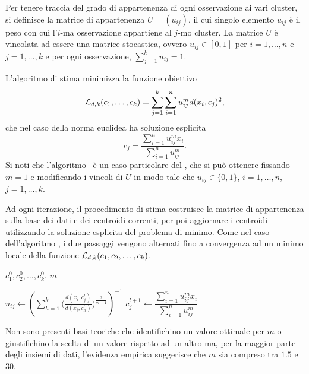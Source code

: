 \documentclass[runningheads]{llncs}
\begin{document}
Per tenere traccia del grado di appartenenza di ogni osservazione ai vari cluster, si definisce la matrice di appartenenza $U = \left( u_{ij} \right)$, il cui singolo elemento $u_{ij}$ è il peso con cui l'$i$-ma osservazione appartiene al $j$-mo cluster.
La matrice $U$ è vincolata ad essere una matrice stocastica, ovvero $u_{ij} \in [0,1]$ per $i = 1, \ldots, n$ e $j = 1, \ldots, k$ e per ogni osservazione, $\sum_{j=1}^{k} u_{ij} = 1$.

L'algoritmo di stima minimizza la funzione obiettivo
\[
     \mathcal{L}_{d,k}(c_1, \ldots, c_k) = \sum_{j=1}^{k} \sum_{i=1}^{n} u_{ij}^{m}d(x_i, c_j)^2 ,
\]
che nel caso della norma euclidea ha soluzione esplicita
\[
    c_j =\frac{ \sum_{i=1}^{n} u_{ij}^{m} x_i}{\sum_{i=1}^{n} u_{ij}^{m}}.
\]
Si noti che l'algoritmo \km\ è un caso particolare del \fcm, che si può ottenere fissando $m=1$ e modificando i vincoli di $U$ in modo tale che $u_{ij} \in \{0,1\}$, $i = 1, \ldots, n$, $j = 1, \ldots, k$.

Ad ogni iterazione, il procedimento di stima costruisce la matrice di appartenenza sulla base dei dati e dei centroidi correnti, per poi aggiornare i centroidi utilizzando la soluzione esplicita del problema di minimo.
Come nel caso dell'algoritmo \km, i due passaggi vengono alternati fino a convergenza ad un minimo locale della funzione $ \mathcal{L}_{d,k}(c_1, c_2, \ldots, c_k)$.

{\centering
\begin{minipage}{\textwidth}
\begin{algorithm}[H]
\caption{\fcm}
\begin{algorithmic}[1]
    \Require $c^{0}_1, c^{0}_2, \ldots, c^{0}_k$, $m$
    \item[]
            \State $u_{ij} \leftarrow \left(\sum_{h=1}^{k} \Big(\frac{d(x_i, c^{l}_j)}{d(x_i, c^{l}_h)}\Big)^{\frac{2}{m-1}}\right)^{-1} $
            \EndFor
        \EndFor
            \State $c^{l+1}_j \leftarrow \dfrac{\sum_{i=1}^{n} u_{ij}^{m}x_i}{\sum_{i=1}^{n} u_{ij}^{m}}$
        \EndFor
    \EndWhile
\end{algorithmic}
\end{algorithm}
\end{minipage}
\par\bigskip
}

Non sono presenti basi teoriche che identifichino un valore ottimale per $m$ o giustifichino la scelta di un valore rispetto ad un altro ma, per la maggior parte degli insiemi di dati, l'evidenza empirica suggerisce che $m$ sia compreso tra $1.5$ e $30$.
\end{document}
